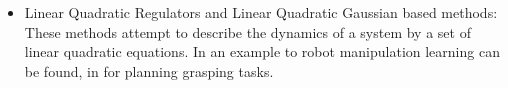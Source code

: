 \begin{itemize}
\begin{itemize}
\item Linear Quadratic Regulators and Linear Quadratic Gaussian based methods: These methods attempt to describe the dynamics of a system by a set of linear quadratic equations. In \cite{Levine.2015} an example to robot manipulation learning can be found, in \cite{PlattRobertJr..2010} for planning grasping tasks.
\end{itemize}
\end{itemize}